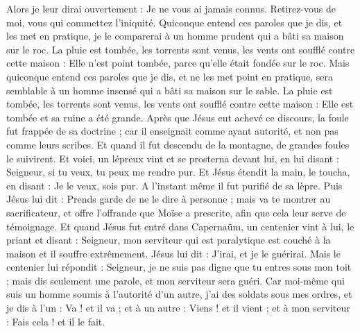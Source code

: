 \begin{multicols}{2}
Alors je leur dirai ouvertement : Je ne vous ai jamais connus. Retirez-vous de moi, vous qui commettez l'iniquité.
Quiconque entend ces paroles que je dis, et les met en pratique, je le comparerai à un homme prudent qui a bâti sa maison sur le roc.
La pluie est tombée, les torrents sont venus, les vents ont soufflé contre cette maison : Elle n'est point tombée, parce qu'elle était fondée sur le roc{}.
Mais quiconque entend ces paroles que je dis, et ne les met point en pratique, sera semblable à un homme insensé qui a bâti sa maison sur le sable.
La pluie est tombée, les torrents sont venus, les vents ont soufflé contre cette maison : Elle est tombée et sa ruine a été grande.
Après que Jésus eut achevé ce discours, la foule fut frappée de sa doctrine ;
car il enseignait comme ayant autorité, et non pas comme leurs scribes.
\VerseOne{}Et quand il fut descendu de la montagne, de grandes foules le suivirent.
Et voici, un lépreux vint et se prosterna devant lui, en lui disant : Seigneur{}, si tu veux, tu peux me rendre pur.
Et Jésus étendit la main, le toucha, en disant : Je le veux, sois pur. A l’instant même il fut purifié de sa lèpre.
Puis Jésus lui dit : Prends garde de ne le dire à personne ; mais va te montrer au sacrificateur, et offre l’offrande que Moïse a prescrite, afin que cela leur serve de témoignage.
Et quand Jésus fut entré dans Capernaüm, un centenier vint à lui, le priant
et disant : Seigneur, mon serviteur qui est paralytique est couché à la maison et il souffre extrêmement.
Jésus lui dit : J'irai, et je le guérirai.
Mais le centenier lui répondit : Seigneur, je ne suis pas digne que tu entres sous mon toit ; mais dis seulement une parole, et mon serviteur sera guéri.
Car moi-même qui suis un homme soumis à l’autorité d’un autre, j'ai des soldats sous mes ordres, et je dis à l'un : Va ! et il va ; et à un autre : Viens ! et il vient ; et à mon serviteur : Fais cela ! et il le fait.

\end{multicols}
